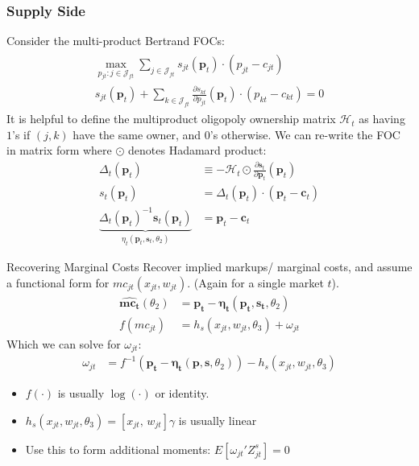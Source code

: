 \documentclass[xcolor=pdftex,dvipsnames,table,mathserif,aspectratio=169]{beamer}
\begin{document}
\begin{frame}[plain]
\frametitle{Supply Side}
\footnotesize
Consider the multi-product Bertrand FOCs:
\begin{align*}
\begin{array}{c}
\max _{p_{j t}: j \in \mathcal{J}_{f t}} \sum_{j \in \mathcal{J}_{f t}} s_{j t}\left(\boldsymbol{p}_{t}\right) \cdot\left(p_{j t}-c_{j t}\right) \\
s_{j t}\left(\boldsymbol{p}_{t}\right)+\sum_{k \in \mathcal{J}_{f t}} \frac{\partial s_{k t}}{\partial p_{j t}}\left(\boldsymbol{p}_{t}\right) \cdot\left(p_{k t}-c_{k t}\right)=0
\end{array}
\end{align*}
It is helpful to define the \alert{multiproduct oligopoly ownership matrix} $\mathcal{H}_t$ as having $1$'s if $(j,k)$ have the same owner, and $0$'s otherwise. We can re-write the FOC in matrix form where $\odot$ denotes Hadamard product:
\begin{align*}
\Delta_{t}\left(\boldsymbol{p}_{t}\right) &\equiv-\mathcal{H}_{t} \odot \frac{\partial \boldsymbol{s}_{t}}{\partial \boldsymbol{p}_{t}}\left(\boldsymbol{p}_{t}\right)\\
s_{t}\left(\boldsymbol{p}_{t}\right) &=\Delta_{t}\left(\boldsymbol{p}_{t}\right) \cdot\left(\boldsymbol{p}_{t}-\boldsymbol{c}_{t}\right) \\
\underbrace{\Delta_{t}\left(\boldsymbol{p}_{t}\right)^{-1} \boldsymbol{s}_{t}\left(\boldsymbol{p}_{t}\right)}_{\eta_{t}\left(\boldsymbol{p}_{t}, \boldsymbol{s}_{t}, \theta_{2}\right)} &=\boldsymbol{p}_{t}-\boldsymbol{c}_{t}
\end{align*}
\end{frame}



\begin{frame}{Recovering Marginal Costs }
Recover implied markups/ marginal costs, and assume a functional form for $mc_{jt}(x_{jt},w_{jt})$. (Again for a single market $t$).
\begin{align*}
\widehat{\mathbf{mc_t}}(\theta_2)&= \mathbf{p_t}- \boldsymbol{\eta_t}(\mathbf{p_t},\mathbf{s_t},\theta_2)\\
f(mc_{jt}) &= h_s(x_{jt} , w_{jt},\theta_3)+ \omega_{jt}
\end{align*}
Which we can solve for $\omega_{jt}$:
\begin{align*}
\omega_{jt} &=  f^{-1}(\mathbf{p_t}- \boldsymbol{\eta_t}(\mathbf{p},\mathbf{s},\theta_2)) - h_s(x_{jt},w_{jt},\theta_3)
\end{align*}
\vspace{-0.4cm}
\begin{itemize}
\item $f(\cdot)$ is usually $\log(\cdot)$ or identity.
\item $h_s(x_{jt},w_{jt},\theta_3) = [x_{jt}, \, w_{jt}] \gamma$ is usually linear
\item Use this to form additional moments: $E[\omega_{jt}' Z_{jt}^{s}]=0$
\end{itemize}
\end{frame}
\end{document}
